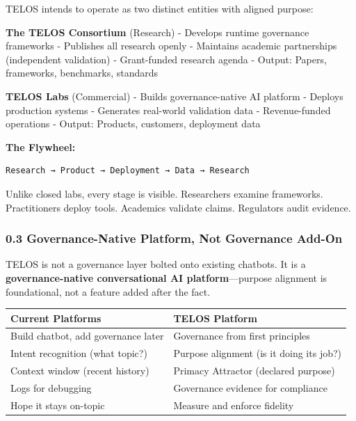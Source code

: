 TELOS intends to operate as two distinct entities with aligned purpose:

\textbf{The TELOS Consortium} (Research) - Develops runtime governance
frameworks - Publishes all research openly - Maintains academic
partnerships (independent validation) - Grant-funded research agenda -
Output: Papers, frameworks, benchmarks, standards

\textbf{TELOS Labs} (Commercial) - Builds governance-native AI platform
- Deploys production systems - Generates real-world validation data -
Revenue-funded operations - Output: Products, customers, deployment data

\textbf{The Flywheel:}

\begin{verbatim}
Research → Product → Deployment → Data → Research
\end{verbatim}

Unlike closed labs, every stage is visible. Researchers examine
frameworks. Practitioners deploy tools. Academics validate claims.
Regulators audit evidence.

\subsubsection{0.3 Governance-Native Platform, Not Governance
Add-On}\label{governance-native-platform-not-governance-add-on}

TELOS is not a governance layer bolted onto existing chatbots. It is a
\textbf{governance-native conversational AI platform}---purpose
alignment is foundational, not a feature added after the fact.

{\def\LTcaptype{none} %
\begin{longtable}[]{@{}
  >{\raggedright\arraybackslash}p{}
  >{\raggedright\arraybackslash}p{}@{}}
\toprule\noalign{}
\begin{minipage}[b]{\linewidth}\raggedright
Current Platforms
\end{minipage} & \begin{minipage}[b]{\linewidth}\raggedright
TELOS Platform
\end{minipage} \\
\midrule\noalign{}
\endhead
\bottomrule\noalign{}
\endlastfoot
Build chatbot, add governance later & Governance from first
principles \\
Intent recognition (what topic?) & Purpose alignment (is it doing its
job?) \\
Context window (recent history) & Primacy Attractor (declared
purpose) \\
Logs for debugging & Governance evidence for compliance \\
Hope it stays on-topic & Measure and enforce fidelity \\
\end{longtable}
}

